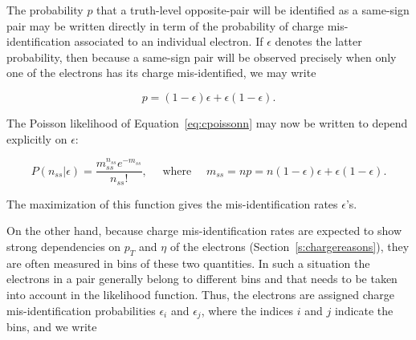 The probability $p$ that a truth-level opposite-pair will be identified as a
same-sign pair may be written directly in term of the probability of charge
mis-identification associated to an individual electron. If $\epsilon$ denotes
the latter probability, then because a same-sign pair will be observed
precisely when only one of the electrons has its charge mis-identified, we may
write

\begin{equation}\label{eq:cprobpair}
	p = (1-\epsilon)\epsilon +  \epsilon(1-\epsilon).
\end{equation}

The Poisson likelihood of Equation~\ref{eq:cpoissonn} may now be written to
depend explicitly on $\epsilon$:

\begin{equation}\label{eq:cpoisson}
	P(n_{ss}|\epsilon) = \frac{m_{ss}^{n_{ss}} e^{-m_{ss}}}{n_{ss}!}, \quad
	\text{ where } \quad
	m_{ss} = np = n(1-\epsilon)\epsilon +  \epsilon(1-\epsilon).
\end{equation}

The maximization of this function gives the mis-identification rates
$\epsilon$'s.

On the other hand, because charge mis-identification rates are expected to show
strong dependencies on $p_T$ and $\eta$ of the electrons
(Section~\ref{s:chargereasons}), they are often measured in bins of these two
quantities. In such a situation the electrons in a pair generally belong to
different bins and that needs to be taken into account in the likelihood
function. Thus, the electrons are assigned charge mis-identification
probabilities $\epsilon_i$ and $\epsilon_j$, where the indices $i$ and $j$
indicate the bins, and we write



